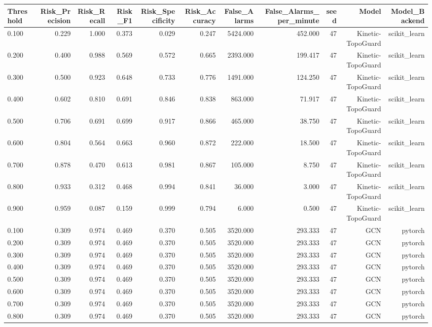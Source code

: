 \begin{tabular}{lrrrrrrrrrr}
\toprule
Threshold & Risk\_Precision & Risk\_Recall & Risk\_F1 & Risk\_Specificity & Risk\_Accuracy & False\_Alarms & False\_Alarms\_per\_minute & seed & Model & Model\_Backend \\
\midrule
0.100 & 0.229 & 1.000 & 0.373 & 0.029 & 0.247 & 5424.000 & 452.000 & 47 & Kinetic-TopoGuard & scikit\_learn \\
0.200 & 0.400 & 0.988 & 0.569 & 0.572 & 0.665 & 2393.000 & 199.417 & 47 & Kinetic-TopoGuard & scikit\_learn \\
0.300 & 0.500 & 0.923 & 0.648 & 0.733 & 0.776 & 1491.000 & 124.250 & 47 & Kinetic-TopoGuard & scikit\_learn \\
0.400 & 0.602 & 0.810 & 0.691 & 0.846 & 0.838 & 863.000 & 71.917 & 47 & Kinetic-TopoGuard & scikit\_learn \\
0.500 & 0.706 & 0.691 & 0.699 & 0.917 & 0.866 & 465.000 & 38.750 & 47 & Kinetic-TopoGuard & scikit\_learn \\
0.600 & 0.804 & 0.564 & 0.663 & 0.960 & 0.872 & 222.000 & 18.500 & 47 & Kinetic-TopoGuard & scikit\_learn \\
0.700 & 0.878 & 0.470 & 0.613 & 0.981 & 0.867 & 105.000 & 8.750 & 47 & Kinetic-TopoGuard & scikit\_learn \\
0.800 & 0.933 & 0.312 & 0.468 & 0.994 & 0.841 & 36.000 & 3.000 & 47 & Kinetic-TopoGuard & scikit\_learn \\
0.900 & 0.959 & 0.087 & 0.159 & 0.999 & 0.794 & 6.000 & 0.500 & 47 & Kinetic-TopoGuard & scikit\_learn \\
0.100 & 0.309 & 0.974 & 0.469 & 0.370 & 0.505 & 3520.000 & 293.333 & 47 & GCN & pytorch \\
0.200 & 0.309 & 0.974 & 0.469 & 0.370 & 0.505 & 3520.000 & 293.333 & 47 & GCN & pytorch \\
0.300 & 0.309 & 0.974 & 0.469 & 0.370 & 0.505 & 3520.000 & 293.333 & 47 & GCN & pytorch \\
0.400 & 0.309 & 0.974 & 0.469 & 0.370 & 0.505 & 3520.000 & 293.333 & 47 & GCN & pytorch \\
0.500 & 0.309 & 0.974 & 0.469 & 0.370 & 0.505 & 3520.000 & 293.333 & 47 & GCN & pytorch \\
0.600 & 0.309 & 0.974 & 0.469 & 0.370 & 0.505 & 3520.000 & 293.333 & 47 & GCN & pytorch \\
0.700 & 0.309 & 0.974 & 0.469 & 0.370 & 0.505 & 3520.000 & 293.333 & 47 & GCN & pytorch \\
0.800 & 0.309 & 0.974 & 0.469 & 0.370 & 0.505 & 3520.000 & 293.333 & 47 & GCN & pytorch \\

\end{tabular}
